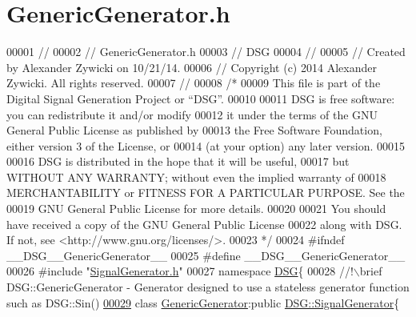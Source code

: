 \hypertarget{_generic_generator_8h_source}{\section{Generic\+Generator.\+h}
\label{_generic_generator_8h_source}
}

\begin{DoxyCode}
00001 \textcolor{comment}{//}
00002 \textcolor{comment}{//  GenericGenerator.h}
00003 \textcolor{comment}{//  DSG}
00004 \textcolor{comment}{//}
00005 \textcolor{comment}{//  Created by Alexander Zywicki on 10/21/14.}
00006 \textcolor{comment}{//  Copyright (c) 2014 Alexander Zywicki. All rights reserved.}
00007 \textcolor{comment}{//}
00008 \textcolor{comment}{/*}
00009 \textcolor{comment}{ This file is part of the Digital Signal Generation Project or “DSG”.}
00010 \textcolor{comment}{}
00011 \textcolor{comment}{ DSG is free software: you can redistribute it and/or modify}
00012 \textcolor{comment}{ it under the terms of the GNU General Public License as published by}
00013 \textcolor{comment}{ the Free Software Foundation, either version 3 of the License, or}
00014 \textcolor{comment}{ (at your option) any later version.}
00015 \textcolor{comment}{}
00016 \textcolor{comment}{ DSG is distributed in the hope that it will be useful,}
00017 \textcolor{comment}{ but WITHOUT ANY WARRANTY; without even the implied warranty of}
00018 \textcolor{comment}{ MERCHANTABILITY or FITNESS FOR A PARTICULAR PURPOSE.  See the}
00019 \textcolor{comment}{ GNU General Public License for more details.}
00020 \textcolor{comment}{}
00021 \textcolor{comment}{ You should have received a copy of the GNU General Public License}
00022 \textcolor{comment}{ along with DSG.  If not, see <http://www.gnu.org/licenses/>.}
00023 \textcolor{comment}{ */}
00024 \textcolor{preprocessor}{#ifndef \_\_DSG\_\_GenericGenerator\_\_}
00025 \textcolor{preprocessor}{#define \_\_DSG\_\_GenericGenerator\_\_}
00026 \textcolor{preprocessor}{#include "\hyperlink{_signal_generator_8h}{SignalGenerator.h}"}
00027 \textcolor{keyword}{namespace }\hyperlink{namespace_d_s_g}{DSG}\{\textcolor{comment}{}
00028 \textcolor{comment}{    //!\(\backslash\)brief DSG::GenericGenerator - Generator designed to use a stateless generator function such as
       DSG::Sin()}
\hypertarget{_generic_generator_8h_source_l00029}{}\hyperlink{class_d_s_g_1_1_generic_generator}{00029} \textcolor{comment}{}    \textcolor{keyword}{class }\hyperlink{class_d_s_g_1_1_generic_generator}{GenericGenerator}:\textcolor{keyword}{public} \hyperlink{class_d_s_g_1_1_signal_generator}{DSG::SignalGenerator}\{

\end{DoxyCode}
